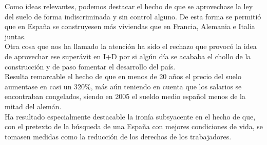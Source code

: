 \documentclass[11pt]{article}
\theoremstyle{plain}
\theoremstyle{definition}
\begin{document}
Como ideas relevantes, podemos destacar el hecho de que se aprovechase 
la ley del suelo de forma indiscriminada y sin control alguno. De esta 
forma se permitió que en España se construyesen más viviendas que en 
Francia, Alemania e Italia juntas.\\

Otra cosa que nos ha llamado la atención ha sido el rechazo que provocó 
la idea de aprovechar ese superávit en I+D por si algún día se acababa
el chollo de la construcción y de paso fomentar el desarrollo del país.\\

Resulta remarcable el hecho de que en menos de 20 años el precio del suelo
aumentase en casi un 320\%, más aún teniendo en cuenta que los salarios se
encontraban congelados, siendo en 2005 el sueldo medio español menos de la
mitad del alemán.\\

Ha resultado especialmente destacable la ironía subsyacente en el hecho de 
que, con el pretexto de la búsqueda de una España con mejores condiciones de 
vida, se tomasen medidas como la reducción de los derechos de los trabajadores.\\
\end{document}
